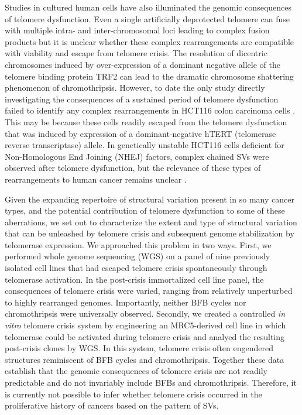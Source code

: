 \documentclass[phd,tocprelim]{cornell}
\begin{document}
Studies in cultured human cells have also illuminated the genomic consequences of telomere dysfunction. Even a single artificially deprotected telomere can fuse with multiple intra- and inter-chromosomal loci leading to complex fusion products \cite{Liddiard2016-ay} but it is unclear whether these complex rearrangements are compatible with viability and escape from telomere crisis. The resolution of dicentric chromosomes induced by over-expression of a dominant negative allele of the telomere binding protein TRF2 can lead to the dramatic chromosome shattering phenomenon of chromothripsis\cite{maciejowski2015,Umbreit2020-kr,Maciejowski2020-bw}. However, to date the only study directly investigating the consequences of a sustained period of telomere dysfunction failed to identify any complex rearrangements in HCT116 colon carcinoma cells \cite{Cleal2019-dk}. This may be because these cells readily escaped from the telomere dysfunction that was induced by expression of a dominant-negative hTERT (telomerase reverse transcriptase) allele. In genetically unstable HCT116 cells deficient for Non-Homologous End Joining (NHEJ) factors, complex chained SVs were observed after telomere dysfunction, but the relevance of these types of rearrangements to human cancer remains unclear \cite{Cleal2019-dk}.

Given the expanding repertoire of structural variation present in so many cancer types, and the potential contribution of telomere dysfunction to some of these aberrations, we set out to characterize the extent and type of structural variation that can be unleashed by telomere crisis and subsequent genome stabilization by telomerase expression. We approached this problem in two ways. First, we performed whole genome sequencing (WGS) on a panel of nine previously isolated cell lines that had escaped telomere crisis spontaneously through telomerase activation. In the post-crisis immortalized cell line panel, the consequences of telomere crisis were varied, ranging from relatively unperturbed to highly rearranged genomes. Importantly, neither BFB cycles nor chromothripsis were universally observed. Secondly, we created a controlled \textit{in vitro} telomere crisis system by engineering an MRC5-derived cell line in which telomerase could be activated during telomere crisis and analyed the resulting post-crisis clones by WGS.  In this system, telomere crisis often engendered structures reminiscent of BFB cycles and chromothripsis. Together these data establish that the genomic consequences of telomere crisis are not readily predictable and do not invariably include BFBs and chromothripsis. Therefore, it is currently not possible to infer whether telomere crisis occurred in the proliferative history of cancers based on the pattern of SVs.
\end{document}
